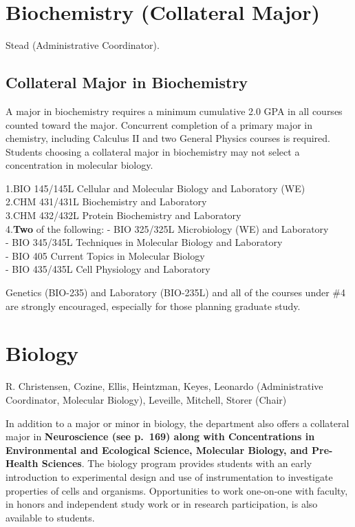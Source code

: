 \documentclass[
  letterpaper,
]{scrbook}
\begin{document}
\section{Biochemistry (Collateral Major)}\label{sec-biochemistry}

Stead (Administrative Coordinator).

\subsection{Collateral Major in
Biochemistry}\label{collateral-major-in-biochemistry}

A major in biochemistry requires a minimum cumulative 2.0 GPA in all
courses counted toward the major. Concurrent completion of a primary
major in chemistry, including Calculus II and two General Physics
courses is required. Students choosing a collateral major in
biochemistry may not select a concentration in molecular biology.

1.BIO 145/145L Cellular and Molecular Biology and Laboratory (WE)\\
2.CHM 431/431L Biochemistry and Laboratory\\
3.CHM 432/432L Protein Biochemistry and Laboratory\\
4.\textbf{Two} of the following: - BIO 325/325L Microbiology (WE) and
Laboratory\\
- BIO 345/345L Techniques in Molecular Biology and Laboratory\\
- BIO 405 Current Topics in Molecular Biology\\
- BIO 435/435L Cell Physiology and Laboratory

Genetics (BIO-235) and Laboratory (BIO-235L) and all of the courses
under \#4 are strongly encouraged, especially for those planning
graduate study.

\section{Biology}\label{biology}

R. Christensen, Cozine, Ellis, Heintzman, Keyes, Leonardo
(Administrative Coordinator, Molecular Biology), Leveille, Mitchell,
Storer (Chair)

In addition to a major or minor in biology, the department also offers a
collateral major in \textbf{Neuroscience (see p.~169) along with
Concentrations in Environmental and Ecological Science, Molecular
Biology, and Pre-Health Sciences}. The biology program provides students
with an early introduction to experimental design and use of
instrumentation to investigate properties of cells and organisms.
Opportunities to work one-on-one with faculty, in honors and independent
study work or in research participation, is also available to students.
\end{document}
